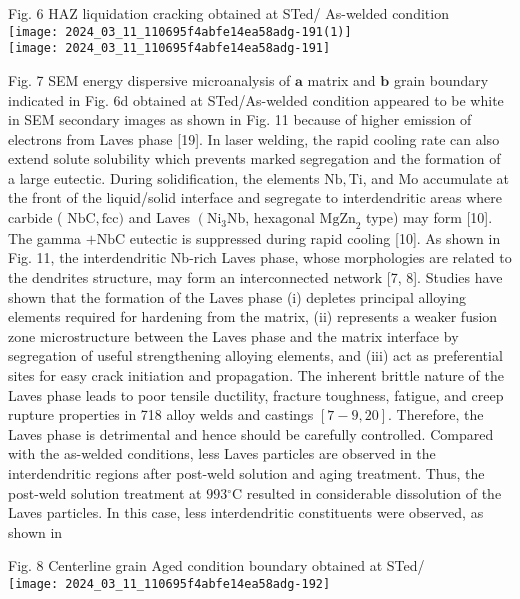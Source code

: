 \documentclass[10pt]{article}
\begin{document}
Fig. 6 HAZ liquidation cracking obtained at STed/ As-welded condition\\
\texttt{[image: 2024\_03\_11\_110695f4abfe14ea58adg-191(1)]}\\
\texttt{[image: 2024\_03\_11\_110695f4abfe14ea58adg-191]}

Fig. 7 SEM energy dispersive microanalysis of $\mathbf{a}$ matrix and $\mathbf{b}$ grain boundary indicated in Fig. 6d obtained at STed/As-welded condition appeared to be white in SEM secondary images as shown in Fig. 11 because of higher emission of electrons from Laves phase [19]. In laser welding, the rapid cooling rate can also extend solute solubility which prevents marked segregation and the formation of a large eutectic. During solidification, the elements $\mathrm{Nb}, \mathrm{Ti}$, and Mo accumulate at the front of the liquid/solid interface and segregate to interdendritic areas where carbide ( $\mathrm{NbC}, \mathrm{fcc})$ and Laves $\left(\mathrm{Ni}_{3} \mathrm{Nb}\right.$, hexagonal $\mathrm{MgZn}_{2}$ type) may form [10]. The gamma $+\mathrm{NbC}$ eutectic is suppressed during rapid cooling [10]. As shown in Fig. 11, the interdendritic Nb-rich Laves phase, whose morphologies are related to the dendrites structure, may form an interconnected network [7, 8]. Studies have shown that the formation of the Laves phase (i) depletes principal alloying elements required for hardening from the matrix, (ii) represents a weaker fusion zone microstructure between the Laves phase and the matrix interface by segregation of useful strengthening alloying elements, and (iii) act as preferential sites for easy crack initiation and propagation. The inherent brittle nature of the Laves phase leads to poor tensile ductility, fracture toughness, fatigue, and creep rupture properties in 718 alloy welds and castings $[7-9,20]$. Therefore, the Laves phase is detrimental and hence should be carefully controlled. Compared with the as-welded conditions, less Laves particles are observed in the interdendritic regions after post-weld solution and aging treatment. Thus, the post-weld solution treatment at $993{ }^{\circ} \mathrm{C}$ resulted in considerable dissolution of the Laves particles. In this case, less interdendritic constituents were observed, as shown in

Fig. 8 Centerline grain Aged condition boundary obtained at STed/\\
\texttt{[image: 2024\_03\_11\_110695f4abfe14ea58adg-192]}
\end{document}
